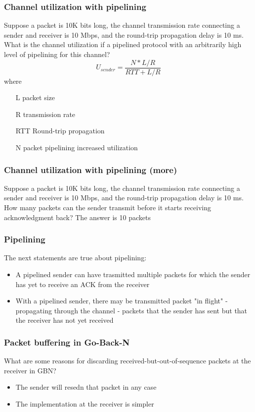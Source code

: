     \newpage
    \subsubsection*{Channel utilization with pipelining}
    \noindent Suppose a packet is 10K bits long, the channel transmission rate connecting a sender and receiver is
    10 Mbps, and the round-trip propagation delay is 10 ms. What is the channel utilization if a pipelined protocol
    with an arbitrarily high level of pipelining for this channel?
    \[U_{sender}=\frac{N*L/R}{RTT+L/R}\]
    where
    \begin{itemize}
        \item[L] packet size 
        \item[R] transmission rate
        \item[RTT]  Round-trip propagation
        \item[N] packet pipelining increased utilization 
    \end{itemize}

    \subsubsection*{Channel utilization with pipelining (more)}
    \noindent Suppose a packet is 10K bits long, the channel transmission rate connecting a sender and receiver is
    10 Mbps, and the round-trip propagation delay is 10 ms. How many packets can the sender transmit before it starts
    receiving acknowledgment back?
    The answer is 10 packets

    \subsubsection*{Pipelining}
    \noindent The next statements are true about pipelining:
    \begin{itemize}
        \item A pipelined sender can have trasmitted multiple packets for which the sender has yet to receive an ACK from the
        receiver
        \item With a pipelined sender, there may be transmitted packet "in flight" - propagating through the channel - packets
        that the sender has sent but that the receiver has not yet received
    \end{itemize}

    \subsubsection*{Packet buffering in Go-Back-N}
    \noindent What are some reasons for discarding received-but-out-of-sequence packets at the receiver in GBN?
    \begin{itemize}
        \item The sender will resedn that packet in any case
        \item The implementation at the receiver is simpler
    \end{itemize}

